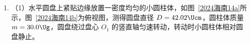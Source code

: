 \documentclass[\gkver]{gaokaozhenti}
\begin{document}
\begin{enumerate}
{联立有

$a_{2} = \frac{F - m_{2}g\sin30^\circ}{m_{2} + CB^{2}L^{2}}$

则说明金属棒 cd 做匀加速直线运动，则有

$x_{0} = \frac{1}{2}a_{2}t^{2}$

联立解得 $a_{2} = 6 \Umsq$，$t = 1.2 \Us$

故 A 错误；

B．由题知，碰前瞬间 ab 的速度为 $4.5 \Ums$，则根据功能关系有

$m_{1}gx_{ab}\sin30^\circ - Q = \frac{1}{2}m_{1}v_{1}^{2}$

金属棒下滑过程中根据动量定理有

$m_{1}g\sin30^\circ\cdot t - B\bar{I}L\cdot t = m_{1}v_{1}$

其中 $q = \bar{I}t = \frac{BLx_{ab}}{R_{\text{总}}}$，$R_{\text{总}} = R + R_{ab} = 0.1 \UO$

联立解得 $q = 6 \UC$，$x_{ab} = 3 \Um$，$Q = 3.9 \UJ$

则 R 上消耗的焦耳热为

$Q_{R} = \frac{R}{R_{\text{总}}}Q = 0.78 \UJ$

故 B 正确；

CD．由于两棒恰好在 M、N 处发生弹性碰撞，取沿斜面向下为正，有

$m_{1}v_{1} - m_{2}v_{2} = m_{1}v_{1}' + m_{2}v_{2}'$

$\frac{1}{2}m_{1}v_{1}^{2} + \frac{1}{2}m_{2}v_{2}^{2} = \frac{1}{2}m_{1}v_{1}'^{2} + \frac{1}{2}m_{2}v_{2}'^{2}$

其中 $v_{2} = a_{2}t = 7.2 \Ums$

联立解得 $v_{1}' = -3.3 \Ums$，$v_{2}' = 8.4 \Ums$

故 C 错误、D 正确。

故选 BD。
}

\item
（1）水平圆盘上紧贴边缘放置一密度均匀的小圆柱体，如图~\ref{2024海南14a}所示，图~\ref{2024海南14b}为俯视图，测得圆盘直径 $D = 42.02 \Ucm$，圆柱体质量 $m = 30.0 \Ug$，圆盘绕过盘心 $O_{1}$ 的竖直轴匀速转动，转动时小圆柱体相对圆盘静止。


\end{enumerate}
\end{document}
